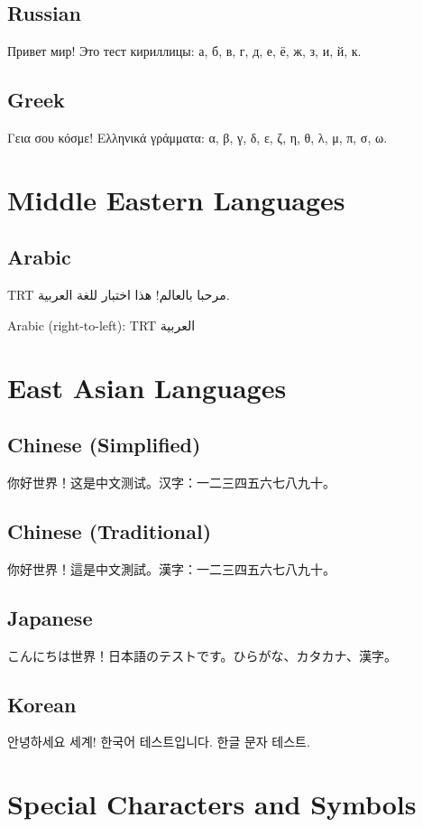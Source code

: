 \documentclass[12pt,a4paper]{article}
\newcommand{\textarabic}[1]{{\arabicfont\textdir TRT #1}}
\newcommand{\textcjk}[1]{{\cjkfont #1}}
\begin{document}
\subsection{Russian}
Привет мир! Это тест кириллицы: а, б, в, г, д, е, ё, ж, з, и, й, к.

\subsection{Greek}
Γεια σου κόσμε! Ελληνικά γράμματα: α, β, γ, δ, ε, ζ, η, θ, λ, μ, π, σ, ω.

\section{Middle Eastern Languages}

\subsection{Arabic}
\textarabic{مرحبا بالعالم! هذا اختبار للغة العربية.}

Arabic (right-to-left): \textarabic{العربية}

\section{East Asian Languages}

\subsection{Chinese (Simplified)}
\textcjk{你好世界！这是中文测试。汉字：一二三四五六七八九十。}

\subsection{Chinese (Traditional)}
\textcjk{你好世界！這是中文測試。漢字：一二三四五六七八九十。}

\subsection{Japanese}
\textcjk{こんにちは世界！日本語のテストです。ひらがな、カタカナ、漢字。}

\subsection{Korean}
\textcjk{안녕하세요 세계! 한국어 테스트입니다. 한글 문자 테스트.}

\section{Special Characters and Symbols}
\end{document}
